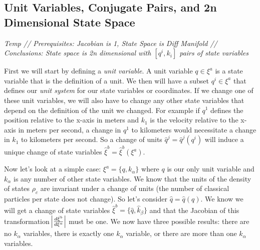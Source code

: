 \documentclass{article}
\begin{document}
\subsection{Unit Variables, Conjugate Pairs, and 2n Dimensional State Space}
\textsl{Temp // Prerequisites: Jacobian is 1, State Space is Diff Manifold // Conclusions: State space is 2n dimensional with $[q^i,k_i]$ pairs of state variables}

	First we will start by defining a \textit{unit variable}. A unit variable $q \in \xi^a$ is a state variable that is the definition of a unit. We then will have a subset $q^i \in \xi^a$ that defines our \textit{unit system} for our state variables or coordinates. If we change one of these unit variables, we will also have to change any other state variables that depend on the definition of the unit we changed. For example if $q^1$ defines the position relative to the x-axis in meters and $k_1$ is the velocity relative to the x-axis in meters per second, a change in $q^1$ to kilometers would necessitate a change in $k_1$ to kilometers per second. So a change of units $\hat{q}^j = \hat{q}^j(q^i)$ will induce a unique change of state variables $\hat{\xi}^b = \hat{\xi}^b(\xi^a)$.
	
	Now let's look at a simple case: $\xi^a = \{q,k_\alpha\}$ where $q$ is our only unit variable and $k_\alpha$ is any number of other state variables. We know that the units of the density of states $\rho_c$ are invariant under a change of units (the number of classical particles per state does not change). So let's consider $\hat{q} = \hat{q}(q)$. We know we will get a change of state variables $\hat{\xi}^b = \{\hat{q},\hat{k}_\beta\}$ and that the Jacobian of this transformation $\abs{\frac{d\hat{\xi}^b}{d\xi^a}}$ must be one. We now have three possible results: there are no $k_\alpha$ variables, there is exactly one $k_\alpha$ variable, or there are more than one $k_\alpha$ variables.
	
\end{document}
